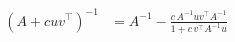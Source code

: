 \begin{align*}
(A + cuv^\top)^{-1} &= A^{-1} - \frac{c\,A^{-1}uv^\top A^{-1}}{1 + c\,v^\top A^{-1}u}
\end{align*}
